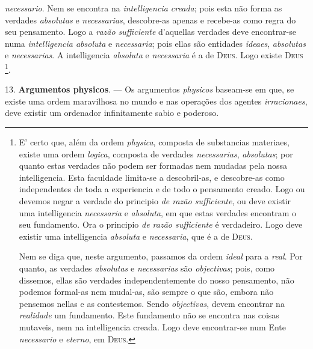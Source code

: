  \emph{necessario}. Nem se encontra na \emph{intelligencia creada}; pois esta não forma as verdades \emph{absolutas} e \emph{necessarias}, descobre-as apenas e recebe-as como regra do seu pensamento. Logo a \emph{razão sufficiente} d'aquellas verdades deve encontrar-se numa \emph{intelligencia absoluta} e \emph{necessaria}; pois ellas são entidades \emph{ideaes}, \emph{absolutas} e \emph{necessarias}. A intelligencia \emph{absoluta} e \emph{necessaria} é a de \textsc{Deus}. Logo existe \textsc{Deus} \footnote{E' certo que, além da ordem \emph{physica}, composta de substancias materiaes, existe uma ordem \emph{logica}, composta de verdades \emph{necessarias}, \emph{absolutas}; por quanto estas verdades não podem ser formadas nem mudadas pela nossa intelligencia. Esta faculdade limita-se a descobril-as, e descobre-as como independentes de toda a experiencia e de todo o pensamento creado. Logo ou devemos negar a verdade do principio \emph{de razão sufficiente}, ou deve existir uma intelligencia \emph{necessaria} e \emph{absoluta}, em que estas verdades encontram o seu fundamento. Ora o principio \emph{de razão sufficiente} é verdadeiro. Logo deve existir uma intelligencia \emph{absoluta} e \emph{necessaria}, que é a de \textsc{Deus}.\par Nem se diga que, neste argumento, passamos da ordem \emph{ideal} para a \emph{real}. Por quanto, as verdades \emph{absolutas} e \emph{necessarias} são \emph{objectivas}; pois, como dissemos, ellas são verdades independentemente do nosso pensamento, não podemos formal-as nem mudal-as, são sempre o que são, embora não pensemos nellas e as contestemos. Sendo \emph{objectivas}, devem encontrar na \emph{realidade} um fundamento. Este fundamento não se encontra nas coisas mutaveis, nem na intelligencia creada. Logo deve encontrar-se num Ente \emph{necessario} e \emph{eterno}, em \textsc{Deus}.}.

13. \textbf{Argumentos physicos}. --- Os argumentos \emph{physicos} baseam-se em que, se existe uma ordem maravilhosa no mundo e nas operações dos agentes \emph{irracionaes}, deve existir um ordenador infinitamente sabio e poderoso.

